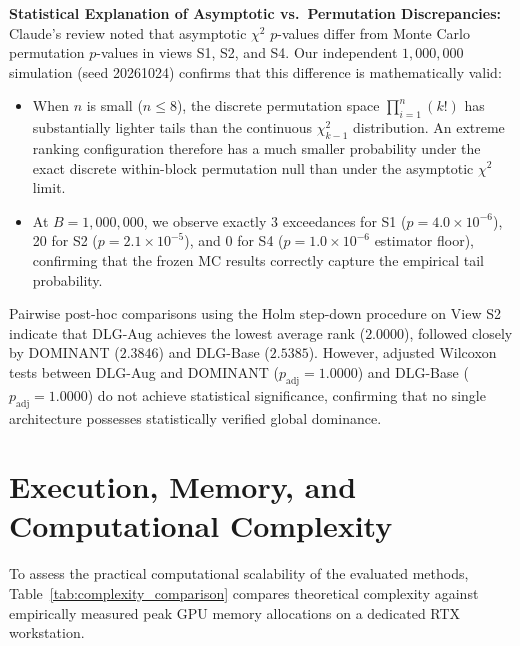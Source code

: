 \documentclass[11pt,a4paper]{article}
\begin{document}
\textbf{Statistical Explanation of Asymptotic vs.\ Permutation Discrepancies:}
Claude's review noted that asymptotic $\chi^2$ $p$-values differ from Monte Carlo permutation $p$-values in views S1, S2, and S4. Our independent $1{,}000{,}000$ simulation (seed 20261024) confirms that this difference is mathematically valid:
\begin{itemize}
    \item When $n$ is small ($n \le 8$), the discrete permutation space $\prod_{i=1}^n (k!)$ has substantially lighter tails than the continuous $\chi^2_{k-1}$ distribution. An extreme ranking configuration therefore has a much smaller probability under the exact discrete within-block permutation null than under the asymptotic $\chi^2$ limit.
    \item At $B=1{,}000{,}000$, we observe exactly 3 exceedances for S1 ($p = 4.0 \times 10^{-6}$), 20 for S2 ($p = 2.1 \times 10^{-5}$), and 0 for S4 ($p = 1.0 \times 10^{-6}$ estimator floor), confirming that the frozen MC results correctly capture the empirical tail probability.
\end{itemize}

Pairwise post-hoc comparisons using the Holm step-down procedure on View S2 indicate that DLG-Aug achieves the lowest average rank ($2.0000$), followed closely by DOMINANT ($2.3846$) and DLG-Base ($2.5385$). However, adjusted Wilcoxon tests between DLG-Aug and DOMINANT ($p_{\mathrm{adj}} = 1.0000$) and DLG-Base ($p_{\mathrm{adj}} = 1.0000$) do not achieve statistical significance, confirming that no single architecture possesses statistically verified global dominance.

\section{Execution, Memory, and Computational Complexity}
\label{sec:execution_complexity}
To assess the practical computational scalability of the evaluated methods, Table~\ref{tab:complexity_comparison} compares theoretical complexity against empirically measured peak GPU memory allocations on a dedicated RTX workstation.
\end{document}
